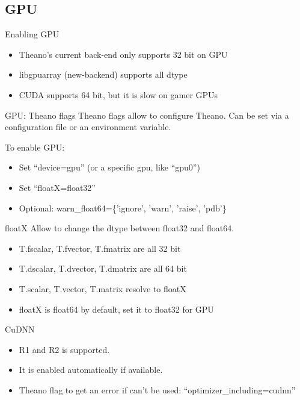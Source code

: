 \documentclass[utf8x,xcolor=pdftex,dvipsnames,table]{beamer}
\begin{document}
\subsection{GPU}
\begin{frame}{Enabling GPU}
  \begin{itemize}
  \item Theano's current back-end only supports 32 bit on GPU
  \item libgpuarray (new-backend) supports all dtype
  \item CUDA supports 64 bit, but it is slow on gamer GPUs
  \end{itemize}
\end{frame}


\begin{frame}{GPU: Theano flags}
  Theano flags allow to configure Theano. Can be set via a
  configuration file or an environment variable.

  To enable GPU:
  \begin{itemize}
  \item Set ``device=gpu'' (or a specific gpu, like ``gpu0'')
  \item Set ``floatX=float32''
  \item Optional: warn\_float64=\{'ignore', 'warn', 'raise', 'pdb'\}
  \end{itemize}
\end{frame}


\begin{frame}{floatX}
  Allow to change the dtype between float32 and float64.
  \begin{itemize}
  \item T.fscalar, T.fvector, T.fmatrix are all 32 bit
  \item T.dscalar, T.dvector, T.dmatrix are all 64 bit
  \item T.scalar, T.vector, T.matrix resolve to floatX
  \item floatX is float64 by default, set it to float32 for GPU
  \end{itemize}
\end{frame}

\begin{frame}{CuDNN}
  \begin{itemize}
  \item R1 and R2 is supported.
  \item It is enabled automatically if available.
  \item Theano flag to get an error if can't be used: ``optimizer\_including=cudnn''
  \end{itemize}
\end{frame}
\end{document}
